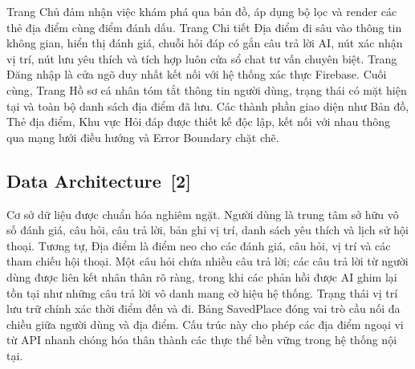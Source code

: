 \documentclass[12pt, a4paper]{article}
\begin{document}
Trang Chủ đảm nhận việc khám phá qua bản đồ, áp dụng bộ lọc và render các thẻ địa điểm cùng điểm đánh dấu. Trang Chi tiết Địa điểm đi sâu vào thông tin không gian, hiển thị đánh giá, chuỗi hỏi đáp có gắn câu trả lời AI, nút xác nhận vị trí, nút lưu yêu thích và tích hợp luôn cửa sổ chat tư vấn chuyên biệt. Trang Đăng nhập là cửa ngõ duy nhất kết nối với hệ thống xác thực Firebase. Cuối cùng, Trang Hồ sơ cá nhân tóm tắt thông tin người dùng, trạng thái có mặt hiện tại và toàn bộ danh sách địa điểm đã lưu. Các thành phần giao diện như Bản đồ, Thẻ địa điểm, Khu vực Hỏi đáp được thiết kế độc lập, kết nối với nhau thông qua mạng lưới điều hướng và Error Boundary chặt chẽ.

\subsection[Data Architecture]{Data Architecture \,{\normalfont\small\textcolor{cyan!70!black}{[2]}}}

Cơ sở dữ liệu được chuẩn hóa nghiêm ngặt. Người dùng là trung tâm sở hữu vô số đánh giá, câu hỏi, câu trả lời, bản ghi vị trí, danh sách yêu thích và lịch sử hội thoại. Tương tự, Địa điểm là điểm neo cho các đánh giá, câu hỏi, vị trí và các tham chiếu hội thoại. Một câu hỏi chứa nhiều câu trả lời; các câu trả lời từ người dùng được liên kết nhân thân rõ ràng, trong khi các phản hồi được AI ghim lại tồn tại như những câu trả lời vô danh mang cờ hiệu hệ thống. Trạng thái vị trí lưu trữ chính xác thời điểm đến và đi. Bảng SavedPlace đóng vai trò cầu nối đa chiều giữa người dùng và địa điểm. Cấu trúc này cho phép các địa điểm ngoại vi từ API nhanh chóng hóa thân thành các thực thể bền vững trong hệ thống nội tại.
\end{document}
